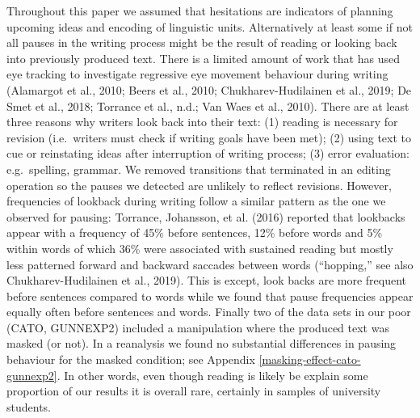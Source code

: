 \documentclass[
  english,
  man,floatsintext]{apa7}
\begin{document}
Throughout this paper we assumed that hesitations are indicators of planning upcoming ideas and encoding of linguistic units. Alternatively at least some if not all pauses in the writing process might be the result of reading or looking back into previously produced text. There is a limited amount of work that has used eye tracking to investigate regressive eye movement behaviour during writing (Alamargot et al., 2010; Beers et al., 2010; Chukharev-Hudilainen et al., 2019; De Smet et al., 2018; Torrance et al., n.d.; Van Waes et al., 2010). There are at least three reasons why writers look back into their text: (1) reading is necessary for revision (i.e.~writers must check if writing goals have been met); (2) using text to cue or reinstating ideas after interruption of writing process; (3) error evaluation: e.g.~spelling, grammar. We removed transitions that terminated in an editing operation so the pauses we detected are unlikely to reflect revisions. However, frequencies of lookback during writing follow a similar pattern as the one we observed for pausing: Torrance, Johansson, et al. (2016) reported that lookbacks appear with a frequency of 45\% before sentences, 12\% before words and 5\% within words of which 36\% were associated with sustained reading but mostly less patterned forward and backward saccades between words ({``hopping,''} see also Chukharev-Hudilainen et al., 2019). This is except, look backs are more frequent before sentences compared to words while we found that pause frequencies appear equally often before sentences and words. Finally two of the data sets in our poor (CATO, GUNNEXP2) included a manipulation where the produced text was masked (or not). In a reanalysis we found no substantial differences in pausing behaviour for the masked condition; see Appendix \ref{masking-effect-cato-gunnexp2}. In other words, even though reading is likely be explain some proportion of our results it is overall rare, certainly in samples of university students.
\end{document}
